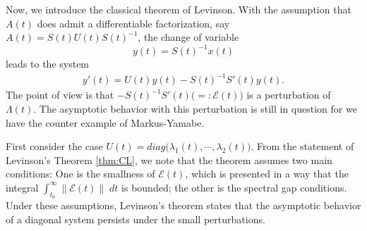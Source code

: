 \documentclass[a4paper,11pt]{article}
\newcommand{\E}{\mathcal{E}}
\newcounter{Theorem}
\theoremstyle{remark}
\begin{document}
Now, we introduce the classical theorem of Levinson. With the assumption that $A(t)$ does admit a differentiable factorization, say $A(t) = S(t)U(t)S(t)^{-1}$, the change of variable $$ y(t) = S(t)^{-1}x(t)$$
leads to the system
\begin{equation*} 
 \begin{aligned}
  y'(t) = U(t)y(t) - S(t)^{-1}S'(t)y(t).
 \end{aligned}
\end{equation*}
The point of view is that $- S(t)^{-1}S'(t) \Big(=: \E(t)\Big)$ is a perturbation of $\Lambda(t)$. The asymptotic behavior with this perturbation is still in question for we have the counter example of Markus-Yamabe. %

First consider the case $U(t)=diag(\lambda_1(t), \cdots, \lambda_2(t)\big)$. From the statement of Levinson's Theorem \ref{thm:CL}, we note that the theorem assumes two main conditions: One is the smallness of $\E(t)$, which is presented in a way that the integral $\int_{t_0}^\infty \|\E(t)\| \;dt$ is bounded; the other is the spectral gap conditions. Under these assumptions, Levinson's theorem states that the asymptotic behavior of a diagonal system persists under the small perturbations. %
% 
% 
\end{document}
